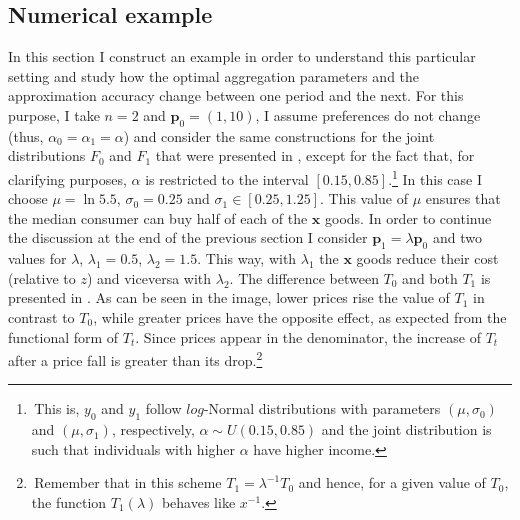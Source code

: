 \documentclass[english, a4paper, 12pt]{article}
\begin{document}
\subsection{Numerical example} \label{ssec:Category-Example}
In this section I construct an example in order to understand this particular setting and study how the optimal aggregation parameters and the approximation accuracy change between one period and the next. For this purpose, I take $n = 2$ and $\mathbf{p}_{0} = (1,10)$, I assume preferences do not change (thus, $\alpha_{0} = \alpha_{1} = \alpha$) and consider the same constructions for the joint distributions $F_{0}$ and $F_{1}$ that were presented in , except for the fact that, for clarifying purposes, $\alpha$ is restricted to the interval $[0.15, 0.85]$.\footnote{\,This is, $y_{0}$ and $y_{1}$ follow $log$-Normal distributions with parameters $(\mu, \sigma_{0})$ and $(\mu, \sigma_{1})$, respectively, $\alpha \sim U(0.15, 0.85)$ and the joint distribution is such that individuals with higher $\alpha$ have higher income.} In this case I choose $\mu = \ln 5.5$, $\sigma_{0} = 0.25$ and $\sigma_{1} \in [0.25, 1.25]$. This value of $\mu$ ensures that the median consumer can buy half of each of the $\mathbf{x}$ goods. In order to continue the discussion at the end of the previous section I consider $\mathbf{p}_{1} = \lambda\mathbf{p}_{0}$ and two values for $\lambda$, $\lambda_{1} = 0.5$, $\lambda_{2} = 1.5$. This way, with $\lambda_{1}$ the $\mathbf{x}$ goods reduce their cost (relative to $z$) and viceversa with $\lambda_{2}$. The difference between $T_{0}$ and both $T_{1}$ is presented in . As can be seen in the image, lower prices rise the value of $T_{1}$ in contrast to $T_{0}$, while greater prices have the opposite effect, as expected from the functional form of $T_{t}$. Since prices appear in the denominator, the increase of $T_{t}$ after a price fall is greater than its drop.\footnote{\,Remember that in this scheme $T_{1} = \lambda^{-1}T_{0}$ and hence, for a given value of $T_{0}$, the function $T_{1}(\lambda)$ behaves like $x^{-1}$.}
\end{document}
